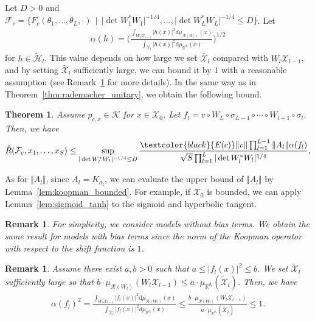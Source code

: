\documentclass[twoside]{article}
\newtheorem{theorem}[proposition]{Theorem}
\newtheorem{remark}[proposition]{Remark}
\def\mcl#1{\mathcal{#1}}
\def\hil{\mcl{H}}
\def\mr{\mathrm}
\def\red#1{\textcolor{black}{#1}}
\begin{document}
Let $D>0$ and $\mcl{F}_c=\{F_c(\theta_1,\ldots,\theta_L,\cdot)\,\mid\,\vert\det{W_1^*W_1}\vert^{-1/4},\ldots,\vert\det{W_L^*W_L}\vert^{-1/4}\le D\}$.
Let 
\begin{align*}
\alpha(h)=\bigg(\frac{\int_{W_l\mcl{X}_{l-1}} |h(x)|^2 d\mu_{\mcl{R}(W_l)}(x)}{\int_{\tilde{\mcl{X}}_l}\vert h(x)\vert^2\mr{d}\mu_{\mathbb{R}^{d_l}}(x)}\bigg)^{1/2}
\end{align*}
for $h\in\tilde{\hil}_l$.
This value depends on how large we set $\tilde{\mcl{X}_l}$ compared with $W_l\mcl{X}_{l-1}$, and by setting $\tilde{\mcl{X}_l}$ sufficiently large, we can bound it by $1$ with a reasonable assumption (see Remark~\ref{rem:alpha} for more details).
In the same way as in Theorem~\ref{thm:rademacher_unitary}, we obtain the following bound.
\begin{theorem}\label{thm:rademacher_injective}
Assume $p_{c,x}\in\mcl{K}$ for $x\in \mcl{X}_0$.
Let $f_l=v\circ W_L\circ \sigma_{L-1}\circ \cdots \circ W_{l+1}\circ \sigma_l$.
Then, we have
\begin{align}
\hat{R}(\mcl{F}_c,x_1,\ldots,x_S)\le \sup_{\vert\det{W_l^*W_l}\vert^{-1/4}\le D}\frac{\red{E(c)}\Vert v\Vert\prod_{l=1}^{L-1}\Vert A_l\Vert \alpha(f_l)}{\sqrt{S}\prod_{l=1}^L\vert\det W_l^*W_l\vert^{1/4}},\label{eq:bound_injective}
\end{align}
\end{theorem}

As for $\Vert A_l\Vert$, since $A_l=K_{\sigma_l}$, we can evaluate the upper bound of $\Vert A_l\Vert$ by Lemma~\ref{lem:koopman_bounded}.
For example, if $\mcl{X}_0$ is bounded, we can apply Lemma~\ref{lem:sigmoid_tanh} to the sigmoid and hyperbolic tangent.

\begin{remark}
For simplicity, we consider models without bias terms.
We obtain the same result for models with bias terms since the norm of the Koopman operator with respect to the shift function is $1$.
\end{remark}

\begin{remark}\label{rem:alpha}
Assume there exist $a,b>0$ such that $a\le \vert f_l(x)\vert^2\le b$.
We set $\tilde{\mcl{X}}_l$ sufficiently large so that $b\cdot \mu_{\mcl{R}(W_l)}(W_l\mcl{X}_{l-1})\le a\cdot\mu_{\mathbb{R}^{d_l}}(\tilde{\mcl{X}}_l)$.
Then, we have
\begin{align*}
\alpha(f_l)^2=\frac{\int_{W_l\mcl{X}_{l-1}}|f_l(x)|^2 \mr{d}\mu_{\mcl{R}(W_l)}(x)}{\int_{\tilde{\mcl{X}}_l} |f_l(x)|^2 d\mu_{\mathbb{R}^{d_l}}(x)}
\le \frac{b\cdot\mu_{\mcl{R}(W_l)}(W_l\mcl{X}_{l-1})}{a\cdot\mu_{\mathbb{R}^{d_l}}(\tilde{\mcl{X}}_l)}\le 1.
\end{align*}
\end{remark}
\end{document}
